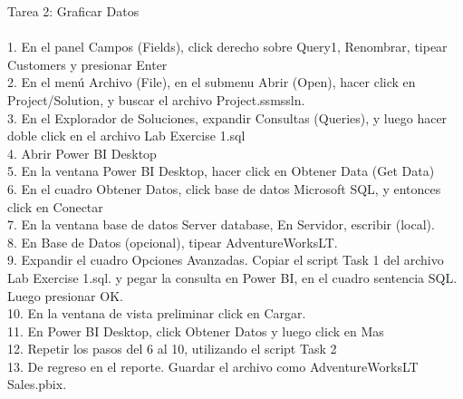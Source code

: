     
\begin{itemize}
    
    Tarea 2: Graficar Datos\\\\
    1.  En el panel Campos (Fields), click derecho sobre Query1, Renombrar, tipear Customers y presionar Enter\\
    2.  En el menú Archivo (File), en el submenu Abrir (Open), hacer click en Project/Solution, y buscar el       archivo Project.ssmssln.\\
    3.  En el Explorador de Soluciones, expandir Consultas (Queries), y luego hacer doble click en el archivo     Lab Exercise 1.sql\\
    4.  Abrir Power BI Desktop\\
    5.  En la ventana Power BI Desktop, hacer click en Obtener Data (Get Data)\\
    6.  En el cuadro Obtener Datos, click base de datos Microsoft SQL, y entonces click en Conectar\\
    7.  En la ventana base de datos Server database, En Servidor, escribir (local).\\
    8.  En Base de Datos (opcional), tipear AdventureWorksLT.\\
    9.  Expandir el cuadro Opciones Avanzadas. Copiar el script Task 1 del archivo Lab Exercise 1.sql. y       pegar la consulta en Power BI, en el cuadro sentencia SQL. Luego presionar OK.\\
    10.  En la ventana de vista preliminar click en Cargar.\\
    11.  En Power BI Desktop, click Obtener Datos y luego click en Mas\\
    12.  Repetir los pasos del 6 al 10, utilizando el script Task 2\\
    13.  De regreso en el reporte. Guardar el archivo como AdventureWorksLT Sales.pbix.\\

\end{itemize} 
    
    
    
    
    
    